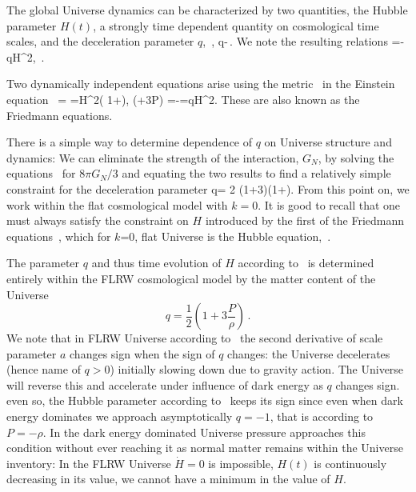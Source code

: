 The global Universe dynamics can be characterized by two quantities, the Hubble parameter $H(t)$, a strongly time dependent quantity on cosmological time scales, and the deceleration parameter $q$,
\beqn\label{dynamic}
\,, 
\eeqn
\beqn\label{dynamic1}
q\equiv -\,.
\eeqn
We note the resulting relations
\beqn\label{eq:Hdot1}
 =-qH^2,
 \eeqn
\beqn\label{eq:Hdot}
 \,. 
\eeqn
{}

Two dynamically independent equations arise using the metric~ in the Einstein equation~
\beqn\label{hubble}
 \rho = 
=H^2\left( 1+\right),
\qquad
{} (\rho+3P) =-=qH^2.
\eeqn
These are also known as the Friedmann equations. 

There is a simple way to determine dependence of $q$ on Universe structure and dynamics: We can eliminate the strength of the interaction, $G_N$, by solving the equations~ for ${8\pi G_N}/{3}$ and equating the two results to find a relatively simple constraint for the deceleration parameter
\beqn\label{qparam0}
q= 2 \left(1+3\right)\left(1+\right).
\eeqn
From this point on, we work within the flat cosmological model with $k=0$. It is good to recall that one must always satisfy the constraint on $H$ introduced by the first of the Friedmann equations~, which for $k$=0, flat Universe is the Hubble equation,~.

The parameter $q$ and thus time evolution of $H$ according to~ is determined entirely within the FLRW cosmological model by the matter content of the Universe
\begin{equation}\label{qparam}
\boxed{q=\frac 1 2 \left(1+3\frac{P}{\rho}\right)}\,.
\end{equation}
We note that in FLRW Universe according to~ the second derivative of scale parameter $a$ changes sign when the sign of $q$ changes: the Universe decelerates (hence name of $q>0$) initially slowing down due to gravity action. The Universe will reverse this and accelerate under influence of dark energy as $q$ changes sign. even so, the Hubble parameter according to~ keeps its sign since even when dark energy dominates we approach asymptotically $q=-1$, that is according to~ $P=-\rho$. In the dark energy dominated Universe pressure approaches this condition without ever reaching it as normal matter remains within the Universe inventory: In the FLRW Universe $\dot H=0$ is impossible, $H(t)$ is continuously decreasing in its value, we cannot have a minimum in the value of $H$. 

